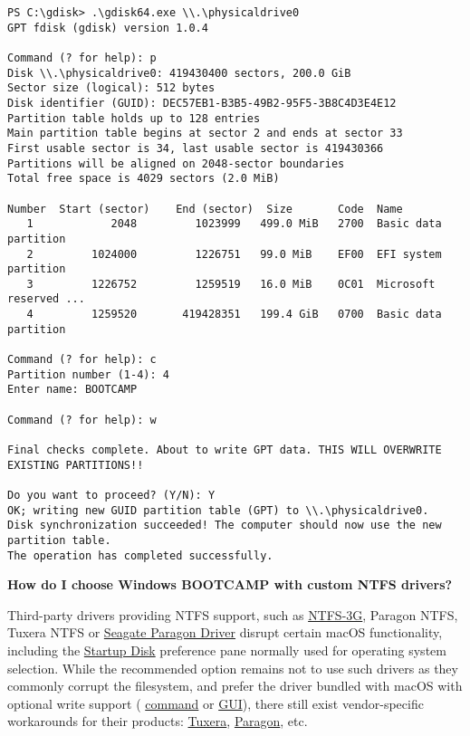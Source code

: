 \documentclass[]{article}
\begin{document}
\begin{lstlisting}[caption=Relabeling Windows volume, label=relabel, style=ocbash]
PS C:\gdisk> .\gdisk64.exe \\.\physicaldrive0
GPT fdisk (gdisk) version 1.0.4

Command (? for help): p
Disk \\.\physicaldrive0: 419430400 sectors, 200.0 GiB
Sector size (logical): 512 bytes
Disk identifier (GUID): DEC57EB1-B3B5-49B2-95F5-3B8C4D3E4E12
Partition table holds up to 128 entries
Main partition table begins at sector 2 and ends at sector 33
First usable sector is 34, last usable sector is 419430366
Partitions will be aligned on 2048-sector boundaries
Total free space is 4029 sectors (2.0 MiB)

Number  Start (sector)    End (sector)  Size       Code  Name
   1            2048         1023999   499.0 MiB   2700  Basic data partition
   2         1024000         1226751   99.0 MiB    EF00  EFI system partition
   3         1226752         1259519   16.0 MiB    0C01  Microsoft reserved ...
   4         1259520       419428351   199.4 GiB   0700  Basic data partition

Command (? for help): c
Partition number (1-4): 4
Enter name: BOOTCAMP

Command (? for help): w

Final checks complete. About to write GPT data. THIS WILL OVERWRITE EXISTING PARTITIONS!!

Do you want to proceed? (Y/N): Y
OK; writing new GUID partition table (GPT) to \\.\physicaldrive0.
Disk synchronization succeeded! The computer should now use the new partition table.
The operation has completed successfully.
\end{lstlisting}


  \textbf{How do I choose Windows BOOTCAMP with custom NTFS drivers?}

  Third-party drivers providing NTFS support, such as
  \href{https://www.tuxera.com/community/open-source-ntfs-3g}{NTFS-3G}, Paragon NTFS,
  Tuxera NTFS or \href{https://www.seagate.com/support/software/paragon}{Seagate Paragon Driver}
  disrupt certain macOS functionality, including the
  \href{https://support.apple.com/HT202796}{Startup Disk} preference
  pane normally used for operating system selection. While the recommended option
  remains not to use such drivers as they commonly corrupt the filesystem, and prefer
  the driver bundled with macOS with optional write support (
  \href{http://osxdaily.com/2013/10/02/enable-ntfs-write-support-mac-os-x}{command} or
  \href{https://mounty.app}{GUI}),
  there still exist vendor-specific workarounds for their products:
  \href{https://www.tuxera.com/products/tuxera-ntfs-for-mac/faq}{Tuxera},
  \href{https://kb.paragon-software.com/article/6604}{Paragon}, etc.
\end{document}
